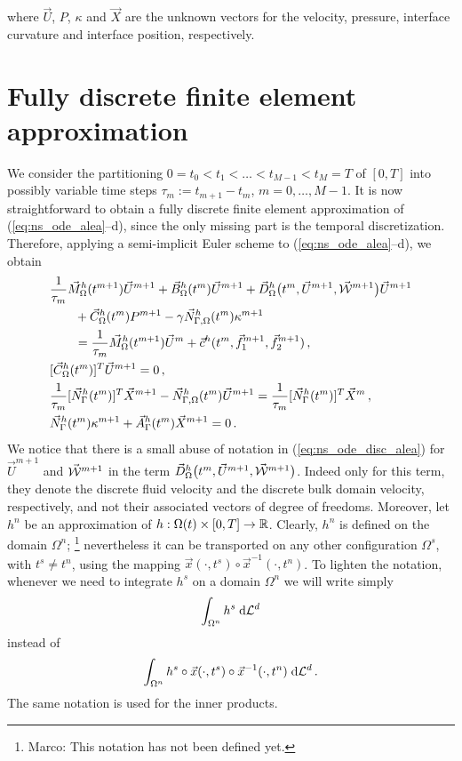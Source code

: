 where $\vec U$, $P$, $\kappa$ and $\vec X$ are the unknown vectors for the
velocity, pressure, interface curvature and interface position, respectively.

\section{Fully discrete finite element approximation}\label{sec:ale_fem}
We consider the partitioning  $0= t_0 < t_1 < \ldots < t_{M-1} < t_M = T$ of
$[0,T]$ into possibly variable time steps $\tau_m := t_{m+1}-t_m$, $m=0
,\ldots, M-1$. It is now straightforward to obtain a fully discrete
finite element
approximation of (\ref{eq:ns_ode_alea}--d), since the only missing part is the
temporal discretization. Therefore, applying a semi-implicit Euler scheme to
(\ref{eq:ns_ode_alea}--d), we obtain
\begin{subequations}
\begin{align}
& \frac{1}{\tau_m}\vec M^h_\Omega(t^{m+1})\vec U^{m+1} +
\vec B^h_\Omega(t^m) \vec U^{m+1} +
\vec D^h_\Omega\big(t^m,\vec U^{m+1},\vec{\mathcal W}^{m+1}\big)\vec U^{m+1} \nonumber \\
& \qquad + \vec C^h_\Omega(t^m) P^{m+1}
- \gamma \vec{N}_{\Gamma,\Omega}^h(t^m) \kappa^{m+1} \nonumber \\
& \qquad = \frac{1}{\tau_m} \vec M^h_\Omega(t^{m+1})\vec U^m
+ \vec c^h(t^m,\vec f_1^{m+1},\vec f_2^{m+1})\,,\label{eq:ns_ode_disc_alea} \\
& [\vec C^h_\Omega(t^m) ]^T \vec U^{m+1} = 0\,,
\label{eq:ns_ode_disc_aleb} \\
& \frac{1}{\tau_m}[\vec N_\Gamma^h(t^m)]^T \vec X^{m+1}
- \vec{N}_{\Gamma,\Omega}^h(t^m)\vec U^{m+1} = \frac{1}{\tau_m}[\vec N_\Gamma^h(t^m)]^T
\vec X^m\,, \label{eq:ns_ode_disc_alec}\\
& \vec N_\Gamma^h(t^m) \kappa^{m+1} + \vec A^h_\Gamma(t^m)\vec X^{m+1}
 = 0\,. \label{eq:ns_ode_disc_aled}
\end{align}
\end{subequations}
We notice that there is a small abuse of notation in (\ref{eq:ns_ode_disc_alea})
for $\vec U^{m+1}$ and $\vec{\mathcal W}^{m+1}$ in the term $\vec D^h_\Omega\big(t^{m},\vec
U^{m+1},\vec{\mathcal W}^{m+1}\big)$. Indeed only for this term, they denote the discrete
fluid velocity and the discrete bulk domain velocity, respectively, and not
their associated vectors of degree of freedoms. Moreover, let $h^n$ be an
approximation of $h:\Omega(t)\times[0,T]\to\mathbb R$. Clearly, $h^n$ is
defined on the domain $\Omega^n$;
\footnote{Marco: This notation has not been defined yet.}
nevertheless it can be transported on any
other configuration $\Omega^s$, with $t^s\neq t^n$, using the mapping
$\vec x(\cdot,t^s)\circ{\vec x}^{-1}(\cdot,t^n)$. To lighten the notation,
whenever we need to integrate $h^s$ on a domain $\Omega^n$ we will write simply
\begin{equation*}
\int_{\Omega^n} h^s \;{\rm d}{\cal L}^{d}
\end{equation*}
instead of
\begin{equation*}
\int_{\Omega^n} h^s\circ \vec x(\cdot,t^s)\circ{\vec x}^{-1}(\cdot,t^n)\;{\rm d}{\cal L}^{d}\,.
\end{equation*}
The same notation is used for the inner products.

